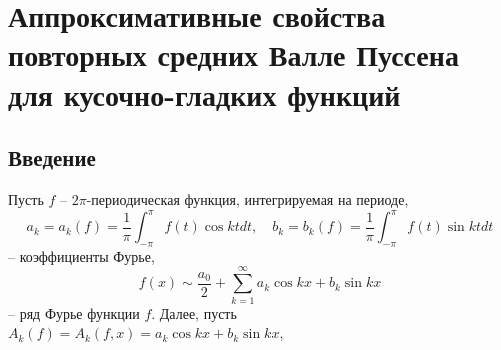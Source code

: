 \chapter{Аппроксимативные свойства повторных средних Валле Пуссена для кусочно-гладких функций}


\section{Введение}\label{valle-pussen-2-s1}

Пусть $f$ -- $2\pi$-периодическая функция, интегрируемая на периоде,
\begin{equation*}
    a_k=a_k(f)=\frac1\pi\int_{-\pi}^\pi f(t)\cos ktdt,\quad b_k=b_k(f)=\frac1\pi\int_{-\pi}^\pi f(t)\sin ktdt
\end{equation*}
-- коэффициенты Фурье,
\begin{equation}\label{valle-pussen-2-1.1}
    f(x) \sim \frac{a_0}{2}+ \sum_{k=1}^\infty a_k\cos kx+b_k\sin kx
\end{equation}
-- ряд Фурье функции $f$. Далее, пусть $A_k(f)=A_k(f,x)=a_k\cos kx+b_k\sin kx$,

